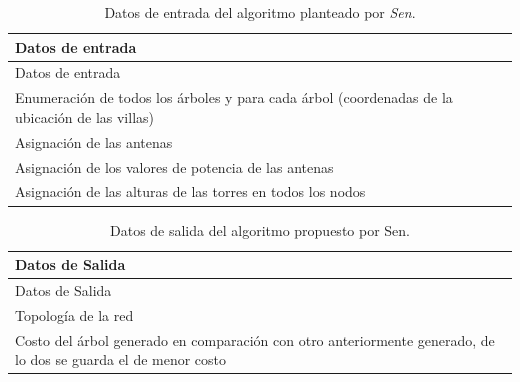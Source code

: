 \documentclass[]{article}
\begin{document}
\begin{longtable}[]{@{}l@{}}
\caption{Datos de entrada del algoritmo planteado por
\emph{Sen}.}\tabularnewline
\toprule
\begin{minipage}[b]{0.97\columnwidth}\raggedright\strut
Datos de entrada\strut
\end{minipage}\tabularnewline
\midrule
\endfirsthead
\toprule
\begin{minipage}[b]{0.97\columnwidth}\raggedright\strut
Datos de entrada\strut
\end{minipage}\tabularnewline
\midrule
\endhead
\begin{minipage}[t]{0.97\columnwidth}\raggedright\strut
Enumeración de todos los árboles y para cada árbol (coordenadas de la
ubicación de las villas)\strut
\end{minipage}\tabularnewline
\begin{minipage}[t]{0.97\columnwidth}\raggedright\strut
Asignación de las antenas\strut
\end{minipage}\tabularnewline
\begin{minipage}[t]{0.97\columnwidth}\raggedright\strut
Asignación de los valores de potencia de las antenas\strut
\end{minipage}\tabularnewline
\begin{minipage}[t]{0.97\columnwidth}\raggedright\strut
Asignación de las alturas de las torres en todos los nodos\strut
\end{minipage}\tabularnewline
\bottomrule
\end{longtable}

\begin{longtable}[]{@{}l@{}}
\caption{Datos de salida del algoritmo propuesto por
Sen.}\tabularnewline
\toprule
\begin{minipage}[b]{0.97\columnwidth}\raggedright\strut
Datos de Salida\strut
\end{minipage}\tabularnewline
\midrule
\endfirsthead
\toprule
\begin{minipage}[b]{0.97\columnwidth}\raggedright\strut
Datos de Salida\strut
\end{minipage}\tabularnewline
\midrule
\endhead
\begin{minipage}[t]{0.97\columnwidth}\raggedright\strut
Topología de la red\strut
\end{minipage}\tabularnewline
\begin{minipage}[t]{0.97\columnwidth}\raggedright\strut
Costo del árbol generado en comparación con otro anteriormente generado,
de lo dos se guarda el de menor costo\strut
\end{minipage}\tabularnewline
\bottomrule
\end{longtable}
\end{document}
